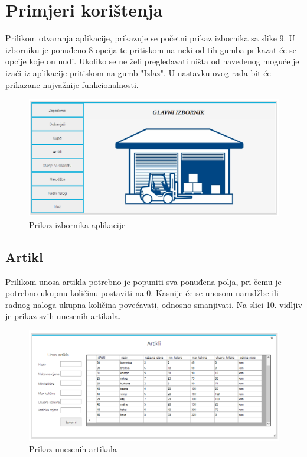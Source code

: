 \documentclass{foi}
\begin{document}
\chapter{Primjeri korištenja}
Prilikom otvaranja aplikacije, prikazuje se početni prikaz izbornika sa slike 9. U izborniku je ponuđeno 8 opcija te pritiskom na neki od tih gumba prikazat će se opcije koje on nudi. Ukoliko se ne želi pregledavati ništa od navedenog moguće je izaći iz aplikacije pritiskom na gumb "Izlaz". U nastavku ovog rada bit će prikazane najvažnije funkcionalnosti.

\begin{figure}[h]
    \centering 
    \includegraphics[width=1.0\textwidth]{slike/izbornik.PNG}
    \caption{Prikaz izbornika aplikacije}
    \label{slika-9}
\end{figure}

\section{Artikl}
Prilikom unosa artikla potrebno je popuniti sva ponuđena polja, pri čemu je potrebno ukupnu količinu postaviti na 0. Kasnije će se unosom narudžbe ili radnog naloga ukupna količina povećavati, odnosno smanjivati. Na slici 10. vidljiv je prikaz svih unesenih artikala.
\begin{figure}[h]
    \centering 
    \includegraphics[width=1.0\textwidth]{slike/prikaz unesenog artikla.PNG}
    \caption{Prikaz unesenih artikala}
    \label{slika-10}
\end{figure}
\newpage
\end{document}
